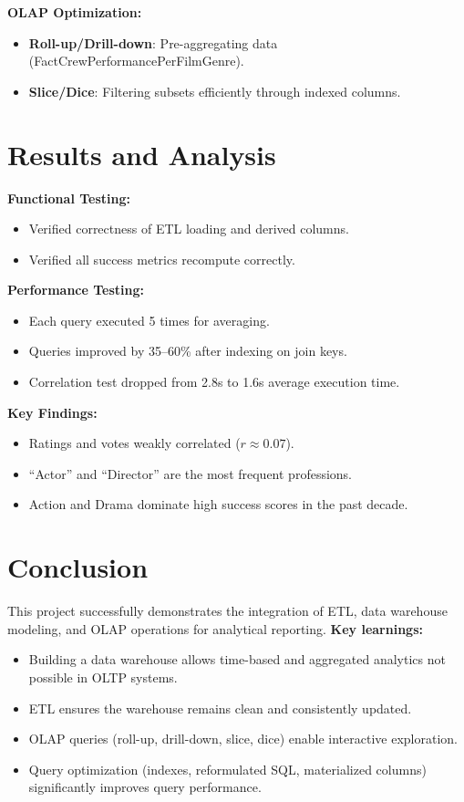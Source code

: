 \documentclass[sigconf, pbalance]{acmart}
\begin{document}
\textbf{OLAP Optimization:}
\begin{itemize}
    \item \textbf{Roll-up/Drill-down}: Pre-aggregating data (FactCrewPerformancePerFilmGenre).
    \item \textbf{Slice/Dice}: Filtering subsets efficiently through indexed columns.
\end{itemize}

\section{Results and Analysis}

\textbf{Functional Testing:}
\begin{itemize}
    \item Verified correctness of ETL loading and derived columns.
    \item Verified all success metrics recompute correctly.
\end{itemize}

\textbf{Performance Testing:}
\begin{itemize}
    \item Each query executed 5 times for averaging.
    \item Queries improved by 35--60\% after indexing on join keys.
    \item Correlation test dropped from 2.8s to 1.6s average execution time.
\end{itemize}

\textbf{Key Findings:}
\begin{itemize}
    \item Ratings and votes weakly correlated ($r \approx 0.07$).
    \item ``Actor'' and ``Director'' are the most frequent professions.
    \item Action and Drama dominate high success scores in the past decade.
\end{itemize}

\section{Conclusion}

This project successfully demonstrates the integration of ETL, data warehouse modeling, and OLAP operations for analytical reporting.  
\textbf{Key learnings:}
\begin{itemize}
    \item Building a data warehouse allows time-based and aggregated analytics not possible in OLTP systems.
    \item ETL ensures the warehouse remains clean and consistently updated.
    \item OLAP queries (roll-up, drill-down, slice, dice) enable interactive exploration.
    \item Query optimization (indexes, reformulated SQL, materialized columns) significantly improves query performance.
\end{itemize}
\end{document}
